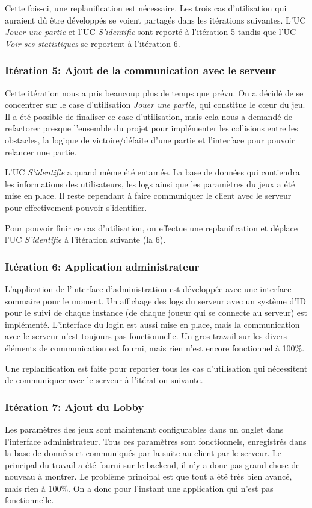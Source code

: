 \documentclass[a4paper,12pt]{article}
\begin{document}
	Cette fois-ci, une replanification est nécessaire. Les trois cas d'utilisation qui auraient dû être développés se voient partagés dans les itérations suivantes. L'UC \textit{Jouer une partie} et l'UC \textit{S'identifie} sont reporté à l'itération 5 tandis que l'UC \textit{Voir ses statistiques} se reportent à l'itération 6.
	
	\subsubsection{Itération 5: Ajout de la communication avec le serveur}
	Cette itération nous a pris beaucoup plus de temps que prévu. On a décidé de se concentrer sur le case d'utilisation \textit{Jouer une partie}, qui constitue le cœur du jeu. Il a été possible de finaliser ce case d'utilisation, mais cela nous a demandé de refactorer presque l'ensemble du projet pour implémenter les collisions entre les obstacles, la logique de victoire/défaite d'une partie et l'interface pour pouvoir relancer une partie.
	
	L'UC \textit{S'identifie} a quand même été entamée. La base de données qui contiendra les informations des utilisateurs, les logs ainsi que les paramètres du jeux a été mise en place. Il reste cependant à faire communiquer le client avec le serveur pour effectivement pouvoir s'identifier.
	
	Pour pouvoir finir ce cas d'utilisation, on effectue une replanification et déplace l'UC \textit{S'identifie} à l'itération suivante (la 6).
	
	\subsubsection{Itération 6: Application administrateur}
	L'application de l'interface d'administration est développée avec une interface sommaire pour le moment. Un affichage des logs du serveur avec un système d'ID pour le suivi de chaque instance (de chaque joueur qui se connecte au serveur) est implémenté. L'interface du login est aussi mise en place, mais la communication avec le serveur n’est toujours pas fonctionnelle. Un gros travail sur les divers éléments de communication est fourni, mais rien n'est encore fonctionnel à 100\%.
	
	Une replanification est faite pour reporter tous les cas d'utilisation qui nécessitent de communiquer avec le serveur à l'itération suivante.
	
	\subsubsection{Itération 7: Ajout du Lobby}
	Les paramètres des jeux sont maintenant configurables dans un onglet dans l'interface administrateur. Tous ces paramètres sont fonctionnels, enregistrés dans la base de données et communiqués par la suite au client par le serveur. Le principal du travail a été fourni sur le backend, il n'y a donc pas grand-chose de nouveau à montrer. Le problème principal est que tout a été très bien avancé, mais rien à 100\%. On a donc pour l'instant une application qui n'est pas fonctionnelle.
	
\end{document}
